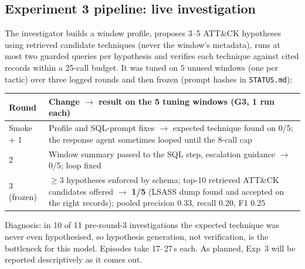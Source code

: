 \documentclass[11pt,a4paper]{article}
\newcommand{\code}[1]{\texttt{\small #1}}
\begin{document}
\subsection{Experiment 3 pipeline: live investigation}
The investigator builds a window profile, proposes 3--5 ATT\&CK hypotheses using retrieved candidate techniques (never the window's metadata), runs at most two guarded queries per hypothesis and verifies each technique against cited records within a 25-call budget. It was tuned on 5 unused windows (one per tactic) over three logged rounds and then frozen (prompt hashes in \code{STATUS.md}):

{\small
\begin{tabularx}{\linewidth}{@{}p{2.2cm}L@{}}
\toprule
\textbf{Round} & \textbf{Change $\to$ result on the 5 tuning windows (G3, 1 run each)}\\
\midrule
Smoke + 1 & Profile and SQL-prompt fixes $\to$ expected technique found on 0/5; the response agent sometimes looped until the 8-call cap \\
2 & Window summary passed to the SQL step, escalation guidance $\to$ 0/5; loop fixed \\
3 (frozen) & $\geq$3 hypotheses enforced by schema; top-10 retrieved ATT\&CK candidates offered $\to$ \textbf{1/5} (LSASS dump found and accepted on the right records); pooled precision 0.33, recall 0.20, F1 0.25 \\
\bottomrule
\end{tabularx}}
Diagnosis: in 10 of 11 pre-round-3 investigations the expected technique was never even hypothesised, so hypothesis generation, not verification, is the bottleneck for this model. Episodes take 17--27\,s each. As planned, Exp~3 will be reported descriptively as it comes out.

\end{document}
